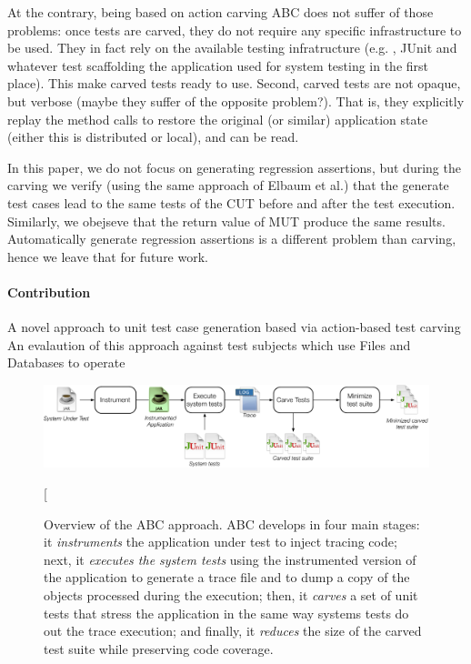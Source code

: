 \documentclass[10pt,conference]{IEEEtran}
\makeatletter
\gdef\xxx{\@ifnextchar[\xxx@lab\xxx@nolab}
\newcommand{\abc}{\textsf{ABC}\xspace}
\makeatother
\begin{document}
At the contrary,  being based on action carving \abc does not suffer of those problems: once tests are carved, they do not require any specific infrastructure to be used. They in fact rely on the available testing infratructure (e.g. , JUnit and whatever test scaffolding the application used for system testing in the first place). This make carved tests ready to use. Second, carved tests are not opaque, but verbose (maybe they suffer of the opposite problem?).
That is, they explicitly replay the method calls to restore the original (or similar) application state (either this is distributed or local), and can be read.

In this paper, we do not focus on generating regression assertions, but during the carving we verify (using the same approach of Elbaum et al.) that the generate test cases lead to the same tests of the CUT before and after the test execution. Similarly, we obejseve that the return value of MUT produce the same results. Automatically generate regression assertions is a different problem than carving, hence we leave that for future work.

\paragraph{Contribution}
A novel approach to unit test case generation based via action-based test carving
An evalaution of this approach against test subjects which use Files and Databases to operate

\begin{figure}[h!]
\centering
\includegraphics[width=\textwidth]{overview}
\caption{Overview of the \abc approach. \abc develops in four main stages: it \emph{instruments} the application under test to inject tracing code; next, it \emph{executes the system tests} using the instrumented version of the application to generate a trace file and to dump a copy of the objects processed during the execution; then, it \emph{carves} a set of unit tests that stress the application in the same way systems tests do out the trace execution; and finally, it \emph{reduces} the size of the carved test suite while preserving code coverage.}\label{fig:overview}
\xxx{Move this to page 2}
\end{figure}
\end{document}
